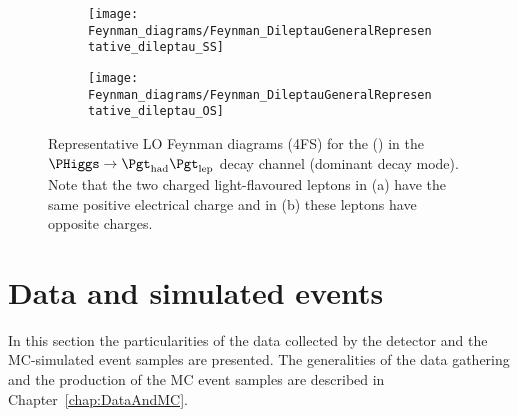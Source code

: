\begin{figure}[h]
  \centering  
  \begin{subfigure}[b]{0.45\textwidth}
    \centering
    \texttt{[image: Feynman\_diagrams/Feynman\_DileptauGeneralRepresentative\_dileptau\_SS]}
    \caption{\dilepSStau}
    \label{fig:tHq:intro:diltauFeynmanDiagram:SS}
  \end{subfigure}
  \hfill
  \begin{subfigure}[b]{0.45\textwidth}
    \centering
    \texttt{[image: Feynman\_diagrams/Feynman\_DileptauGeneralRepresentative\_dileptau\_OS]}
    \caption{\dilepOStau}
    \label{fig:tHq:intro:diltauFeynmanDiagram:OS}
  \end{subfigure}
  \caption{Representative LO Feynman diagrams (4FS) for the \tHq (\dileptau) in the $\PHiggs \rightarrow \tauhad \taulep$ decay channel 
  (dominant decay mode).
  Note that the two charged light-flavoured leptons in (a) have the same positive electrical 
  charge and in (b) these leptons have opposite charges.}
  \label{fig:tHq:intro:diltauFeynmanDiagram}
\end{figure}









\section{Data and simulated events }
\label{sec:ChaptH:Data_and_MC}
In this section the particularities of the data collected by the detector 
and the MC-simulated event samples are presented. The generalities 
of the data gathering and the production of the MC event samples are
described in Chapter~\ref{chap:DataAndMC}.

